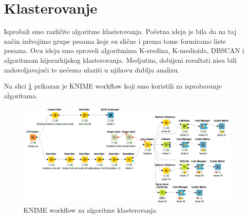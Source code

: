 \section{Klasterovanje}
\label{sec:Klasterovanje}

Isprobali smo razli\v{c}ite algoritme klasterovanja. Po\v{c}etna ideja je bila da na taj na\v{c}in izdvojimo grupe pesama koje su sli\v{c}ne i prema tome formiramo liste pesama. Ovu ideju smo sproveli algoritmima K-sredina, K-medioida, DBSCAN i algoritmom hijerarhijskog klasterovanja. Medjutim, dobijeni rezultati nisu bili zadovoljavaju\'c{}i te ne\'c{}emo ulaziti u njihovu dublju analizu.

Na slici \ref{fig:knime-klasterovanje} prikazan je KNIME workflow koji smo koristili za isprobavanje algoritama.

\begin{figure}[H]
    \centering
    \includegraphics[scale=0.5]{KNIME-workflows/screenshots/klasterovanje.PNG}
    \caption{KNIME workflow za algoritme klasterovanja}
    \label{fig:knime-klasterovanje}
\end{figure}


